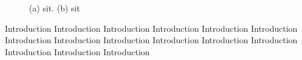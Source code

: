 \begin{figure}[h!]
	\centering
	\caption{(a) sit. (b) sit}
\end{figure}
Introduction Introduction Introduction Introduction Introduction Introduction Introduction Introduction Introduction Introduction Introduction Introduction Introduction Introduction Introduction
